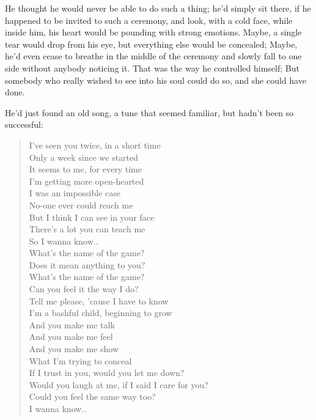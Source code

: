 He thought he would never be able to do such a thing; he'd simply sit there, if he happened to be invited to such a ceremony, and look, with a cold face, while inside him, his heart would be pounding with strong emotions. Maybe, a single tear would drop from his eye, but everything else would be concealed; Maybe, he'd even cease to breathe in the middle of the ceremony and slowly fall to one side without anybody noticing it. That was the way he controlled himself; But somebody who really wished to see into his soul could do so, and she could have done.

He'd just found an old song, a tune that seemed familiar, but hadn't been so successful:
\begin{quote}
I've seen you twice, in a short time \\
Only a week since we started \\
It seems to me, for every time \\
I'm getting more open-hearted \\[1\baselineskip]

I was an impossible case \\
No-one ever could reach me \\
But I think I can see in your face \\
There's a lot you can teach me \\
So I wanna know.. \\[1\baselineskip]

What's the name of the game? \\
Does it mean anything to you? \\
What's the name of the game? \\
Can you feel it the way I do? \\
Tell me please, 'cause I have to know \\
I'm a bashful child, beginning to grow \\[1\baselineskip]

And you make me talk \\
And you make me feel \\
And you make me show \\
What I'm trying to conceal \\
If I trust in you, would you let me down? \\
Would you laugh at me, if I said I care for you? \\
Could you feel the same way too? \\
I wanna know.. \\[1\baselineskip]


\end{quote}
